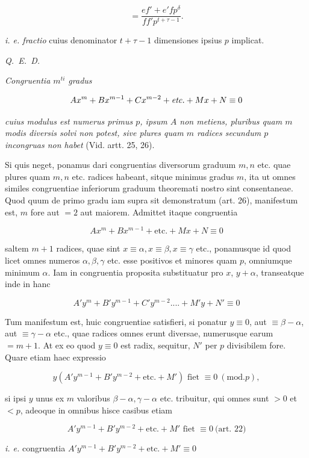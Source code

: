 \[=\frac{ef'+e'fp^\delta}{ff'p^{t+\tau-1}}.\]

\noindent\emph{i. e. fractio} cuius denominator $t+\tau-1$ dimensiones ipsius $p$ implicat.\par
\noindent\mbox{\emph{Q. E. D.}}



\emph{Congruentia $m^{ti}$ gradus}

\[Ax^m+Bx^{m-1}+Cx^{m-2}+\emph{etc.}+Mx+N\equiv0\]

\noindent\emph{cuius modulus est numerus primus $p$, ipsum $A$ non metiens, pluribus quam $m$ modis diversis solvi non potest, sive plures quam $m$ radices secundum $p$ incongruas non habet} (Vid. artt. 25, 26).

Si quis neget, ponamus dari congruentias diversorum graduum $m,n$ etc. quae plures quam $m,n$ etc. radices habeant, sitque minimus gradus $m$, ita ut omnes similes congruentiae inferiorum graduum theoremati nostro sint consentaneae. Quod quum de primo gradu iam supra sit demonstratum (art. 26), manifestum est, $m$ fore aut $=2$ aut maiorem. Admittet itaque congruentia

\[Ax^m+Bx^{m-1}+\text{etc.}+Mx+N\equiv0\]

\noindent saltem $m+1$ radices, quae sint $x\equiv\alpha,x\equiv\beta,x\equiv\gamma$ etc., ponamusque id quod licet omnes numeros $\alpha,\beta,\gamma$ etc. esse positivos et minores quam $p$, omniumque minimum $\alpha$. Iam in congruentia proposita substituatur pro $x$, $y+\alpha$, transeatque inde in hanc

\[A'y^m+B'y^{m-1}+C'y^{m-2}....+M'y+N'\equiv0\]

Tum manifestum est, huic congruentiae satisfieri, si ponatur $y\equiv0$, aut $\equiv\beta-\alpha$, aut $\equiv\gamma-\alpha$ etc., quae radices omnes erunt diversae, numerusque earum $=m+1$. At ex eo quod $y\equiv0$ est radix, sequitur, $N'$ per $p$ divisibilem fore. Quare etiam haec expressio

\[y(A'y^{m-1}+B'y^{m-2}+\text{etc.}+M')\text{ fiet }\equiv0\ (\mathrm{mod.}p),\]

\noindent si ipsi $y$ unus ex $m$ valoribus $\beta-\alpha,\gamma-\alpha$ etc. tribuitur, qui omnes sunt $>0$ et $<p$, adeoque in omnibus hisce casibus etiam

\[A'y^{m-1}+B'y^{m-2}+\text{etc.}+M'\text{ fiet }\equiv0\ \text{(art. 22)}\]

\noindent\emph{i. e.} congruentia \qquad $A'y^{m-1}+B'y^{m-2}+\text{etc.}+M'\equiv0$

